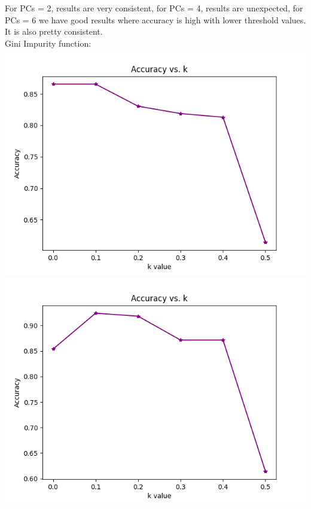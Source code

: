 \documentclass[12pt, letterpaper]{article}
\begin{document}
\begin{enumerate}[label=\Roman*.]
\begin{enumerate}[label=\arabic*.]
		For PCs = 2, results are very consistent, for PCs = 4, results are unexpected, for PCs = 6 we have good results where accuracy is high with lower threshold values. It is also pretty consistent.\\
		
		Gini Impurity function: \\
		\includegraphics[scale=0.5]{../images/accuracy_validation_DT_Threshold_gini_2.png} 
		\includegraphics[scale=0.5]{../images/accuracy_validation_DT_Threshold_gini_4.png} 

\end{enumerate}
\end{enumerate}
\end{document}
